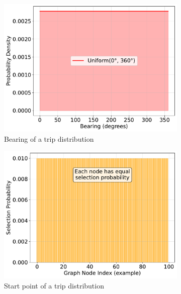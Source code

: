 \begin{figure}
\begin{subfigure}{0.49\linewidth}
        \centering
        \includegraphics[width=\linewidth]{./fig/bearing-distribution-no-labels.pdf}
        \caption{Bearing of a trip distribution}
        \label{fig:trip-bearing-distribution}
    \end{subfigure}
    \hfill
    \begin{subfigure}{0.49\linewidth}
        \centering
        \includegraphics[width=\linewidth]{./fig/start-point-distribution-no-labels.pdf}
        \caption{Start point of a trip distribution}
        \label{fig:trip-start-point-distribution}
    \end{subfigure}
    \vfill
    \begin{subfigure}{0.49\linewidth}
        \centering

\end{subfigure}
\end{figure}
